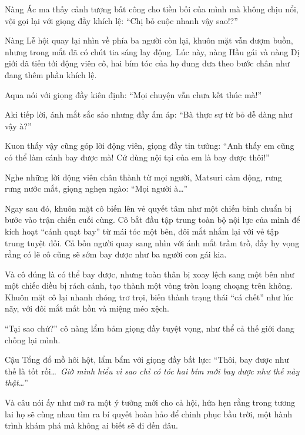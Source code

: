 \documentclass[../main.tex]{subfiles}
\begin{document}
Nàng Ác ma thấy cảnh tượng bất công cho tiền bối của mình mà không chịu nổi, vội gọi lại với giọng đầy khích lệ: ``Chị bỏ cuộc nhanh vậy sao!?''

Nàng Lễ hội quay lại nhìn về phía ba người còn lại, khuôn mặt vẫn đượm buồn, nhưng trong mắt đã có chút tia sáng lay động. Lúc này, nàng Hầu gái và nàng Dị giới đã tiến tới động viên cô, hai bím tóc của họ đung đưa theo bước chân như đang thêm phần khích lệ.

Aqua nói với giọng đầy kiên định: ``Mọi chuyện vẫn chưa kết thúc mà!''

Aki tiếp lời, ánh mắt sắc sảo nhưng đầy ấm áp: ``Bà thực sự từ bỏ dễ dàng như vậy à?''

Kuon thấy vậy cũng góp lời động viên, giọng đầy tin tưởng: ``Anh thấy em cũng có thể làm cánh bay được mà! Cứ dùng nội tại của em là bay được thôi!''

Nghe những lời động viên chân thành từ mọi người, Matsuri cảm động, rưng rưng nước mắt, giọng nghẹn ngào: ``Mọi người à\dots''

Ngay sau đó, khuôn mặt cô biến lên vẻ quyết tâm như một chiến binh chuẩn bị bước vào trận chiến cuối cùng. Cô bắt đầu tập trung toàn bộ nội lực của mình để kích hoạt ``cánh quạt bay'' từ mái tóc một bên, đôi mắt nhắm lại với vẻ tập trung tuyệt đối. Cả bốn người quay sang nhìn với ánh mắt trầm trồ, đầy hy vọng rằng có lẽ cô cũng sẽ sớm bay được như ba người con gái kia.

Và cô đúng là có thể bay được, nhưng toàn thân bị xoay lệch sang một bên như một chiếc diều bị rách cánh, tạo thành một vòng tròn loạng choạng trên không. Khuôn mặt cô lại nhanh chóng trơ trọi, biến thành trạng thái ``cá chết'' như lúc nãy, với đôi mắt mất hồn và miệng méo xệch.


``Tại sao chứ?'' cô nàng lẩm bảm giọng đầy tuyệt vọng, như thể cả thế giới đang chống lại mình.

Cậu Tổng đổ mồ hôi hột, lẩm bẩm với giọng đầy bất lực: ``Thôi, bay được như thế là tốt rồi\dots\ \textit{Giờ mình hiểu vì sao chỉ có tóc hai bím mới bay được như thế này thật\dots}''

Và câu nói ấy như mở ra một ý tưởng mới cho cả hội, hứa hẹn rằng trong tương lai họ sẽ cùng nhau tìm ra bí quyết hoàn hảo để chinh phục bầu trời, một hành trình khám phá mà không ai biết sẽ đi đến đâu.

\omk
\end{document}
